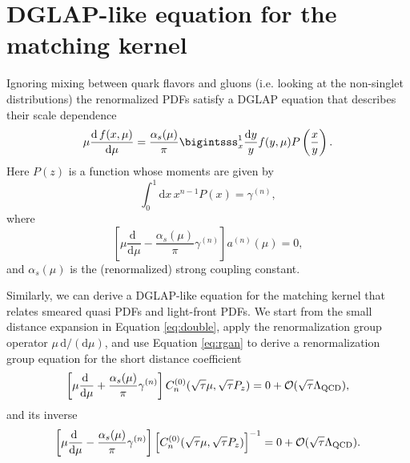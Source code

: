 \section{\label{sec:match}DGLAP-like equation for the matching kernel}

Ignoring mixing between quark flavors and gluons (i.e. looking at the 
non-singlet distributions) the renormalized PDFs satisfy a DGLAP equation 
\cite{Gribov:1972rt,Dokshitzer:1977sg,Altarelli:1977zs} that describes their 
scale dependence
\begin{equation}
\mu\frac{\mathrm{d}\, f(x,\mu)}{\mathrm{d}\mu} = \frac{\alpha_s(\mu)}{\pi} 
\bigintsss_x^1 
\frac{\mathrm{d}y}{y} f(y,\mu) P\left(\frac{x}{y}\right).
\end{equation}
Here $P\left(z\right)$ is a function whose moments are given by
\begin{equation}\label{eq:gamman}
\int_0^1 \mathrm{d}x\, x^{n-1} P(x) = \gamma^{(n)},
\end{equation}
where 
\begin{equation}\label{eq:rgan}
\left[\mu\frac{\mathrm{d}\;}{\mathrm{d}\mu} -\frac{\alpha_s(\mu)}{\pi}  
\gamma^{(n)} \right]a^{(n)}(\mu) = 0,
\end{equation}
and $\alpha_s(\mu)$ is the (renormalized) strong coupling constant.
 
Similarly, we can derive a DGLAP-like equation for the 
matching kernel that relates smeared quasi PDFs and light-front PDFs. We start 
from the small distance expansion in Equation \eqref{eq:double}, apply 
the renormalization group operator $\mu \,\mathrm{d}/(\mathrm{d}\mu)$, and use 
Equation \eqref{eq:rgan} to derive a renormalization group equation for the 
short distance coefficient
\begin{equation}
\left[\mu\frac{\mathrm{d}\;}{\mathrm{d}\mu} + 
\frac{\alpha_s(\mu)}{\pi}\gamma^{(n)}\right]C_n^{(0)}(\sqrt{\tau}\mu,\sqrt{\tau}
P_z ) = 0+ 
{\cal 
O}(\sqrt{\tau}\Lambda_{\mathrm{QCD}}),
\end{equation}
and its inverse
\begin{equation}
\left[\mu\frac{\mathrm{d}\;}{\mathrm{d}\mu}-
\frac{\alpha_s(\mu)}{\pi}\gamma^{(n)}\right] 
\left[C_n^{(0)}(\sqrt{\tau}\mu,\sqrt{\tau}
P_z)\right]^{-1} = 0+ {\cal 
O}(\sqrt{\tau}\Lambda_{\mathrm{QCD}}).
\end{equation}

